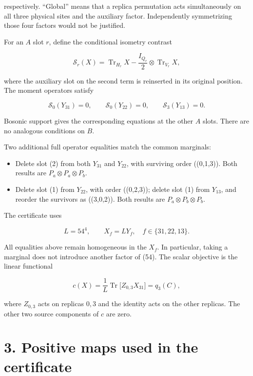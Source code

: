 \documentclass[
  11pt,
]{article}
\providecommand{\tightlist}{%
  \setlength{\itemsep}{0pt}\setlength{\parskip}{0pt}}
\begin{document}
respectively. ``Global'' means that a replica permutation acts
simultaneously on all three physical sites and the auxiliary factor.
Independently symmetrizing those four factors would not be justified.

For an \(A\) slot \(r\), define the conditional isometry contrast

\[
\mathcal S_r(X)=\operatorname{Tr}_{H_r}X
-\frac{I_{Q_r}}2\otimes\operatorname{Tr}_{V_r}X,
\tag{12}
\]

where the auxiliary slot on the second term is reinserted in its
original position. The moment operators satisfy

\[
\mathcal S_0(Y_{31})=0,\qquad
\mathcal S_0(Y_{22})=0,\qquad
\mathcal S_3(Y_{13})=0.
\tag{13}
\]

Bosonic support gives the corresponding equations at the other \(A\)
slots. There are no analogous conditions on \(B\).

Two additional full operator equalities match the common marginals:

\begin{itemize}
\tightlist
\item
  Delete slot (2) from both \(Y_{31}\) and \(Y_{22}\), with surviving
  order ((0,1,3)). Both results are \(P_a\otimes P_a\otimes P_b\).
\item
  Delete slot (1) from \(Y_{22}\), with order ((0,2,3)); delete slot (1)
  from \(Y_{13}\), and reorder the survivors as ((3,0,2)). Both results
  are \(P_a\otimes P_b\otimes P_b\).
\end{itemize}

The certificate uses

\[
L=54^4,\qquad X_f=LY_f,\quad f\in\{31,22,13\}.
\tag{14}
\]

All equalities above remain homogeneous in the \(X_f\). In particular,
taking a marginal does not introduce another factor of (54). The scalar
objective is the linear functional

\[
c(X)=\frac1L\operatorname{Tr}\bigl[Z_{0,3}X_{31}\bigr]=q_3(C),
\tag{15}
\]

where \(Z_{0,3}\) acts on replicas \(0,3\) and the identity acts on the
other replicas. The other two source components of \(c\) are zero.

\section{3. Positive maps used in the
certificate}\label{positive-maps-used-in-the-certificate}
\end{document}
